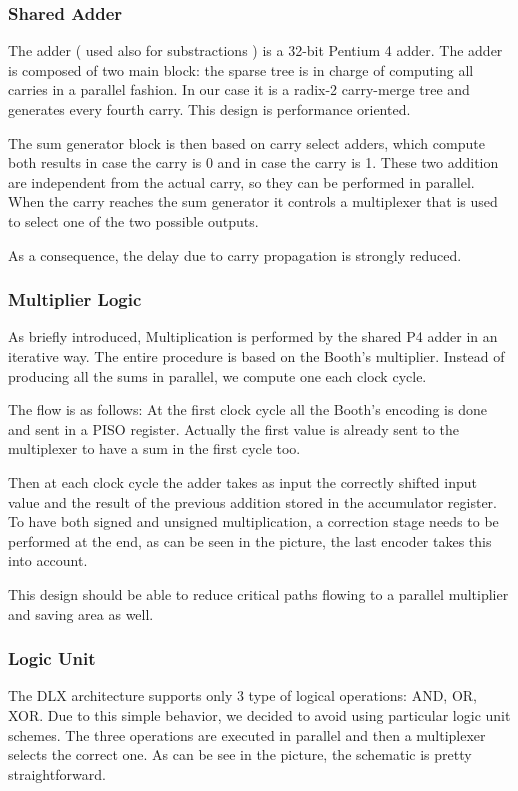 \documentclass[12pt]{article}
\begin{document}
\subsubsection{Shared Adder}
The adder ( used also for substractions ) is a 32-bit Pentium 4 adder.
The adder is composed of two main block: the sparse tree is in charge of computing all carries in a parallel fashion. In our case it is a radix-2 carry-merge tree and generates every fourth carry. This design is performance oriented.

The sum generator block is then based on carry select adders, which compute both results in case the carry is 0 and in case the carry is 1. These two addition are independent from the actual carry, so they can be performed in parallel. When the carry reaches the sum generator it controls a multiplexer that is used to select one of the two possible outputs.

As a consequence, the delay due to carry propagation is strongly reduced.
\subsubsection{Multiplier Logic}
As briefly introduced, Multiplication is performed by the shared P4 adder in an iterative way.
The entire procedure is based on the Booth's multiplier. Instead of producing all the sums in parallel, we compute one each clock cycle.

The flow is as follows:
At the first clock cycle all the Booth's encoding is done and sent in a PISO register. Actually the first value is already sent to the multiplexer to have a sum in the first cycle too.

Then at each clock cycle the adder takes as input the correctly shifted input value and the result of the previous addition stored in the accumulator register.
To have both signed and unsigned multiplication, a correction stage needs to be performed at the end, as can be seen in the picture, the last encoder takes this into account.

This design should be able to reduce critical paths flowing to a parallel multiplier and saving area as well.
\subsubsection{Logic Unit}
The DLX architecture supports only 3 type of logical operations: AND, OR, XOR. 
Due to this simple behavior, we decided to avoid using particular logic unit schemes.
The three operations are executed in parallel and then a multiplexer selects the correct one. 
As can be see in the picture, the schematic is pretty straightforward.
\end{document}
